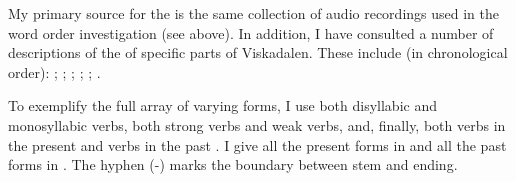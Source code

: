 \documentclass[output=paper,colorlinks,citecolor=brown,draft,draftmode]{langscibook}
\begin{document}
My primary source for the   is the same collection of audio recordings used in the word order investigation (see  above). In addition, I have consulted a number of descriptions of the  of specific parts of Viskadalen. These include (in chronological order): \citet{Moller1858}; \citet{Belfrage1871}; \citet{Andersson1922}; \citet{Kalen1923}; \citet{Lindberg1927}; \citet{GotlindLandtmanson1950}.



To exemplify the full array of varying forms, I use both disyllabic and monosyllabic verbs, both strong verbs and weak verbs, and, finally, both verbs in the present  and verbs in the past . I give all the present  forms in  and all the past  forms in . The hyphen (-) marks the boundary between stem and ending.


\begin{table}
\caption{\label{tab:petzell:2a}Viskadalian present tense inflection}
\end{table}
\end{document}
